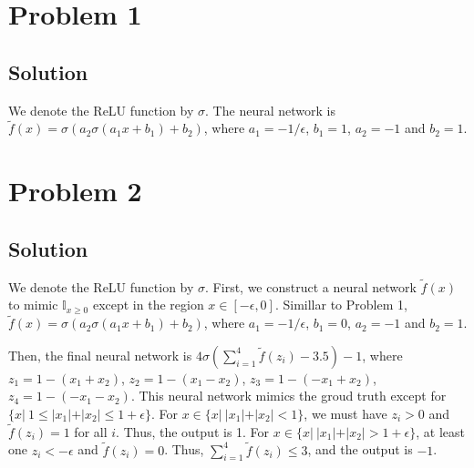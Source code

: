 \documentclass[11pt]{report}
\begin{document}

\section*{Problem 1}
\subsection*{Solution}
We denote the ReLU function by $\sigma$. The neural network is $\tilde{f}(x) = \sigma(a_2\sigma(a_1 x + b_1)+b_2)$, where $a_1 = -1/\epsilon$, $b_1 = 1$, $a_2 = -1$ and $b_2 = 1$.
\section*{Problem 2}
\subsection*{Solution}
We denote the ReLU function by $\sigma$. First, we construct a neural network $\tilde{f}(x)$ to mimic $\mathbb{I}_{x \geq 0}$ except in the region $x \in [-\epsilon, 0]$. Simillar to Problem 1, $\tilde{f}(x) = \sigma(a_2\sigma(a_1 x + b_1)+b_2)$, where $a_1 = -1/\epsilon$, $b_1 = 0$, $a_2 = -1$ and $b_2 = 1$.

\noindent Then, the final neural network is $4\sigma(\sum_{i=1}^{4} \tilde{f}(z_i) - 3.5)-1$, where $z_1 = 1 - (x_1 + x_2)$, $z_2 = 1 - (x_1 - x_2)$, $z_3 = 1 - (-x_1 + x_2)$, $z_4 = 1 - (-x_1 - x_2)$. This neural network mimics the groud truth except for $\{x |\ 1 \leq |x_1| + |x_2| \leq 1 + \epsilon\}$. For $x \in \{x |\ |x_1| + |x_2| < 1\}$, we must have $z_i > 0$ and $\tilde{f}(z_i) = 1$ for all $i$. Thus, the output is 1. For $x \in \{x |\ |x_1| + |x_2| > 1 + \epsilon \}$, at least one $z_i < -\epsilon$ and $\tilde{f}(z_i) = 0$. Thus, $\sum_{i=1}^{4} \tilde{f}(z_i) \leq 3$, and the output is $-1$.
\end{document}

